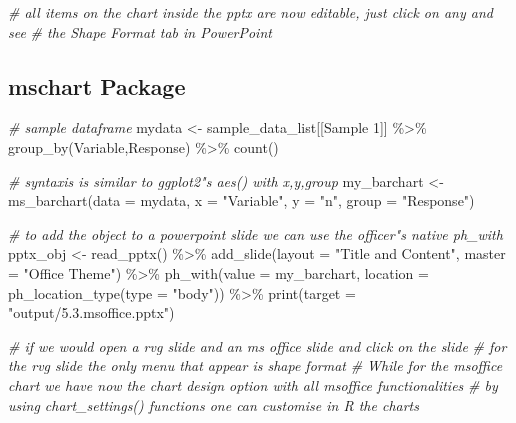 \documentclass[
]{book}
\newenvironment{Shaded}{\begin{snugshade}}{\end{snugshade}}
\newcommand{\AttributeTok}[1]{\textcolor[rgb]{0.77,0.63,0.00}{#1}}
\newcommand{\CommentTok}[1]{\textcolor[rgb]{0.56,0.35,0.01}{\textit{#1}}}
\newcommand{\FunctionTok}[1]{\textcolor[rgb]{0.00,0.00,0.00}{#1}}
\newcommand{\NormalTok}[1]{#1}
\newcommand{\OtherTok}[1]{\textcolor[rgb]{0.56,0.35,0.01}{#1}}
\newcommand{\SpecialCharTok}[1]{\textcolor[rgb]{0.00,0.00,0.00}{#1}}
\newcommand{\StringTok}[1]{\textcolor[rgb]{0.31,0.60,0.02}{#1}}
\begin{document}
\begin{Shaded}
\begin{Highlighting}[]
\CommentTok{\# all items on the chart inside the pptx are now editable, just click on any and see }
\CommentTok{\# the Shape Format tab in PowerPoint}
\end{Highlighting}
\end{Shaded}

\hypertarget{mschart-package}{%
\subsection{mschart Package}\label{mschart-package}}

\begin{Shaded}
\begin{Highlighting}[]
\CommentTok{\# sample dataframe}
\NormalTok{mydata }\OtherTok{\textless{}{-}}\NormalTok{ sample\_data\_list[[}\StringTok{\textquotesingle{}Sample 1\textquotesingle{}}\NormalTok{]] }\SpecialCharTok{\%\textgreater{}\%}
  \FunctionTok{group\_by}\NormalTok{(Variable,Response) }\SpecialCharTok{\%\textgreater{}\%} \FunctionTok{count}\NormalTok{()}

\CommentTok{\# syntaxis is similar to ggplot2"s aes() with x,y,group}
\NormalTok{my\_barchart }\OtherTok{\textless{}{-}} \FunctionTok{ms\_barchart}\NormalTok{(}\AttributeTok{data =}\NormalTok{ mydata, }\AttributeTok{x =} \StringTok{"Variable"}\NormalTok{, }\AttributeTok{y =} \StringTok{"n"}\NormalTok{, }\AttributeTok{group =} \StringTok{"Response"}\NormalTok{)}

\CommentTok{\# to add the object to a powerpoint slide we can use the officer"s native ph\_with}
\NormalTok{pptx\_obj }\OtherTok{\textless{}{-}} \FunctionTok{read\_pptx}\NormalTok{() }\SpecialCharTok{\%\textgreater{}\%}
  \FunctionTok{add\_slide}\NormalTok{(}\AttributeTok{layout =} \StringTok{"Title and Content"}\NormalTok{, }\AttributeTok{master =} \StringTok{"Office Theme"}\NormalTok{) }\SpecialCharTok{\%\textgreater{}\%}
  \FunctionTok{ph\_with}\NormalTok{(}\AttributeTok{value =}\NormalTok{ my\_barchart, }\AttributeTok{location =} \FunctionTok{ph\_location\_type}\NormalTok{(}\AttributeTok{type =} \StringTok{"body"}\NormalTok{)) }\SpecialCharTok{\%\textgreater{}\%}
  \FunctionTok{print}\NormalTok{(}\AttributeTok{target =} \StringTok{"output/5.3.msoffice.pptx"}\NormalTok{) }

\CommentTok{\# if we would open a rvg slide and an ms office slide and click on the slide}
\CommentTok{\# for the rvg slide the only menu that appear is shape format}
\CommentTok{\# While for the msoffice chart we have now the chart design option with all msoffice functionalities}
\CommentTok{\# by using chart\_settings() functions one can customise in R the charts}
\end{Highlighting}
\end{Shaded}
\end{document}
